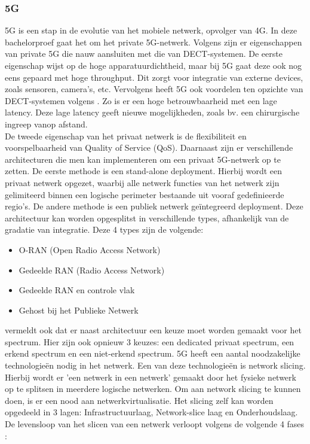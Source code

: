 \subsubsection{5G}
5G is een stap in de evolutie van het mobiele netwerk, opvolger van 4G. In deze bachelorproef gaat het om het private 5G-netwerk. Volgens \textcite{wen2021private} zijn er eigenschappen van private 5G die nauw aansluiten met die van DECT-systemen. De eerste eigenschap wijst op de hoge apparatuurdichtheid, maar bij 5G gaat deze ook nog eens gepaard met hoge throughput. Dit zorgt voor integratie van externe devices, zoals sensoren, camera's, etc. Vervolgens heeft 5G ook voordelen ten opzichte van DECT-systemen volgens \textcite{wen2021private}. Zo is er een hoge betrouwbaarheid met een lage latency. Deze lage latency geeft nieuwe mogelijkheden, zoals bv. een chirurgische ingreep vanop afstand.\\ De tweede eigenschap van het privaat netwerk is de flexibiliteit en voorspelbaarheid van Quality of Service (QoS). Daarnaast zijn er verschillende architecturen die men kan implementeren om een privaat 5G-netwerk op te zetten. De eerste methode is een stand-alone deployment. Hierbij wordt een privaat netwerk opgezet, waarbij alle netwerk functies van het netwerk zijn gelimiteerd binnen een logische perimeter bestaande uit vooraf gedefinieerde regio's. De andere methode is een publiek netwerk geïntegreerd deployment. Deze architectuur kan worden opgesplitst in verschillende types, afhankelijk van de gradatie van integratie. Deze 4 types zijn de volgende:

\begin{itemize}
  \item O-RAN (Open Radio Access Network)
  \item Gedeelde RAN (Radio Access Network)
  \item Gedeelde RAN en controle vlak
  \item Gehost bij het Publieke Netwerk
\end{itemize}

\textcite{wen2021private} vermeldt ook dat er naast architectuur een keuze moet worden gemaakt voor het spectrum. Hier zijn ook opnieuw 3 keuzes: een dedicated privaat spectrum, een erkend spectrum en een niet-erkend spectrum. 
5G heeft een aantal noodzakelijke technologieën nodig in het netwerk. Een van deze technologieën is network slicing. Hierbij wordt er 'een netwerk in een netwerk' gemaakt door het fysieke netwerk op te splitsen in meerdere logische netwerken. Om aan network slicing te kunnen doen, is er een nood aan netwerkvirtualisatie. Het slicing zelf kan worden opgedeeld in 3 lagen: Infrastructuurlaag, Network-slice laag en Onderhoudslaag. De levensloop van het slicen van een netwerk verloopt volgens de volgende 4 fases \autocite{wen2021private}:

